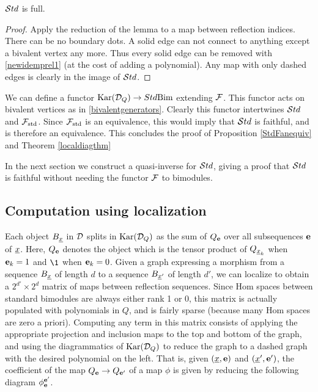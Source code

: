 \begin{cor} $\mathcal{S}td$ is full. \end{cor}

\begin{proof} Apply the reduction of the lemma to a map between reflection indices. There can be no boundary dots. A solid edge can not connect to anything except a
bivalent vertex any more. Thus every solid edge can be removed with \eqref{newidemprel1} (at the cost of adding a polynomial). Any map with only dashed edges is clearly in the image of
$\mathcal{S}td$. \end{proof}

We can define a functor $\textrm{Kar}({\mathcal{D}}_Q) \rightarrow Std\textrm{Bim}$ extending ${\mathcal{F}}$. This functor acts on bivalent vertices as in \eqref{bivalentgenerators}. Clearly this functor intertwines $\mathcal{S}td$ and
${\mathcal{F}}_{\textrm{std}}$. Since ${\mathcal{F}}_{\textrm{std}}$ is an equivalence, this would imply that $\mathcal{S}td$ is faithful, and is therefore an equivalence. This concludes the proof of Proposition \ref{StdFanequiv} and Theorem \ref{localdiagthm}

In the next section we construct a quasi-inverse for $\mathcal{S}td$, giving a proof that $\mathcal{S}td$ is faithful without needing the functor ${\mathcal{F}}$ to bimodules.

\subsection{Computation using localization}
\label{subsec-compute}

Each object $B_{\underline{x}}$ in ${\mathcal{D}}$ splits in $\textrm{Kar}({\mathcal{D}}_Q)$ as the sum of $Q_{\mathbf e}$ over all subsequences ${\mathbf e}$ of ${\underline{x}}$. Here, $Q_{\mathbf e}$ denotes the object which is the tensor product of $Q_{{\underline{x}}_k}$
when ${\mathbf e}_k=1$ and $\1$ when ${\mathbf e}_k=0$. Given a graph expressing a morphism from a sequence $B_{\underline{x}}$ of length $d$ to a sequence $B_{{\underline{x}}'}$ of length $d'$, we can localize to obtain a $2^{d'} \times 2^d$ matrix of maps
between reflection sequences. Since Hom spaces between standard bimodules are always either rank 1 or 0, this matrix is actually populated with polynomials in $Q$, and is fairly sparse
(because many Hom spaces are zero a priori). Computing any term in this matrix consists of applying the appropriate projection and inclusion maps to the top and bottom of the graph, and
using the diagrammatics of $\textrm{Kar}({\mathcal{D}}_Q)$ to reduce the graph to a dashed graph with the desired polynomial on the left. That is, given $({\underline{x}},{\mathbf e})$ and $({\underline{x}}',{\mathbf e}')$, the coefficient of the
map $Q_{\mathbf e} \rightarrow Q_{{\mathbf e}'}$ of a map $\phi$ is given by reducing the following diagram $\phi_{\mathbf e}^{{\mathbf e}'}$.


